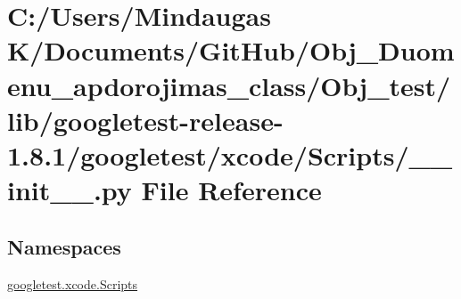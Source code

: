 \hypertarget{_obj__test_2lib_2googletest-release-1_88_81_2googletest_2xcode_2_scripts_2____init_____8py}{}\section{C\+:/\+Users/\+Mindaugas K/\+Documents/\+Git\+Hub/\+Obj\+\_\+\+Duomenu\+\_\+apdorojimas\+\_\+class/\+Obj\+\_\+test/lib/googletest-\/release-\/1.8.1/googletest/xcode/\+Scripts/\+\_\+\+\_\+init\+\_\+\+\_\+.py File Reference}
\label{_obj__test_2lib_2googletest-release-1_88_81_2googletest_2xcode_2_scripts_2____init_____8py}
\subsection*{Namespaces}
\begin{DoxyCompactItemize}
\item 
 \mbox{\hyperlink{namespacegoogletest_1_1xcode_1_1_scripts}{googletest.\+xcode.\+Scripts}}
\end{DoxyCompactItemize}
